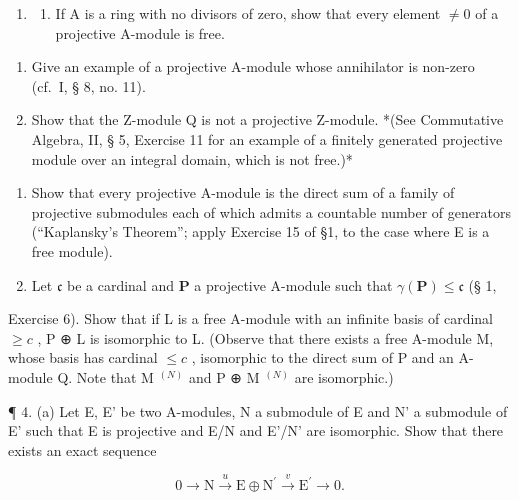 \BourbakiExercisesSection

\begin{enumerate}
\def\labelenumi{\arabic{enumi}.}
\tightlist
\item
  \begin{enumerate}
  \def\labelenumii{(\alph{enumii})}
  \tightlist
  \item
    If A is a ring with no divisors of zero, show that every element \(\neq0\) of a projective A-module is free.
  \end{enumerate}
\end{enumerate}

\begin{enumerate}
\def\labelenumi{(\alph{enumi})}
\setcounter{enumi}{1}
\item
  Give an example of a projective A-module whose annihilator is non-zero (cf.~I, § 8, no. 11).
\item
  Show that the Z-module Q is not a projective Z-module. *(See Commutative Algebra, II, § 5, Exercise 11 for an example of a finitely generated projective module over an integral domain, which is not free.)*
\end{enumerate}

\begin{enumerate}
\def\labelenumi{\arabic{enumi}.}
\setcounter{enumi}{1}
\item
  Show that every projective A-module is the direct sum of a family of projective submodules each of which admits a countable number of generators (``Kaplansky's Theorem''; apply Exercise 15 of §1, to the case where E is a free module).
\item
  Let \(\mathfrak{c}\) be a cardinal and \(\mathbf{P}\) a projective A-module such that \(\gamma(\mathbf{P}) \leqslant \mathfrak{c}\) (§ 1,
\end{enumerate}

Exercise 6). Show that if L is a free A-module with an infinite basis of cardinal \(\geqslant c\) , P ⊕ L is isomorphic to L. (Observe that there exists a free A-module M, whose basis has cardinal \(\leqslant c\) , isomorphic to the direct sum of P and an A-module Q. Note that M \(^{(N)}\) and P ⊕ M \(^{(N)}\) are isomorphic.)

¶ 4. (a) Let E, E' be two A-modules, N a submodule of E and N' a submodule of E' such that E is projective and E/N and E'/N' are isomorphic. Show that there exists an exact sequence

\[
0 \longrightarrow \mathrm{N} \stackrel {u} {\longrightarrow} \mathrm{E} \oplus \mathrm{N} ^ {\prime} \stackrel {v} {\longrightarrow} \mathrm{E} ^ {\prime} \longrightarrow 0.
\]

